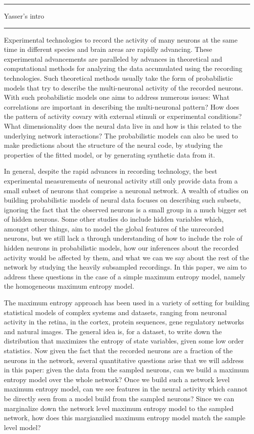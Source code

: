\documentclass[\ifafour a4paper,12pt,\else a5paper,10pt,\fi%
onecolumn,oneside,article,%
british%
]{memoir}
\theoremstyle{remark}
\theoremstyle{innote}
\renewcommand*{\|}{\nonscript\,\vert\nonscript\;\mathopen{}}
\begin{document}
\hrule
Yasser's intro
\hrule
{\footnotesize
Experimental technologies to record the activity of many neurons at the
same time in different species and brain areas are rapidly advancing. These
experimental advancements are paralleled by advances in theoretical and
computational methods for analyzing the data accumulated using the
recording technologies. Such theoretical methods usually take the form of
probabilistic models that try to describe the multi-neuronal activity of
the recorded neurons. With such probabilistic models one aims to address
numerous issues: What correlations are important in describing the
multi-neuronal pattern? How does the pattern of activity covary with
external stimuli or experimental conditions? What dimensionality does the
neural data live in and how is this related to the underlying network
interactions? The probabilistic models can also be used to make predictions
about the structure of the neural code, by studying the properties of the
fitted model, or by generating synthetic data from it.

In general, despite the rapid advances in recording technology, the best
experimental measurements of neuronal activity still only provide data from
a small subset of neurons that comprise a neuronal network. A wealth of
studies on building probabilistic models of neural data focuses on
describing such subsets, ignoring the fact that the observed neurons is a
small group in a much bigger set of hidden neurons. Some other studies do
include hidden variables which, amongst other things, aim to model the
global features of the unrecorded neurons, but we still lack a through
understanding of how to include the role of hidden neurons in probabilistic
models, how our inferences about the recorded activity would be affected by
them, and what we can we say about the rest of the network by studying the
heavily subsampled recordings. In this paper, we aim to address these
questions in the case of a simple maximum entropy model, namely the
homogeneous maximum entropy model.

The maximum entropy approach has been used in a variety of setting for
building statistical models of complex systems and datasets, ranging from
neuronal activity in the retina, in the cortex, protein sequences, gene
regulatory networks and natural images. The general idea is, for a dataset,
to write down the distribution that maximizes the entropy of state
variables, given some low order statistics. Now given the fact that the
recorded neurons are a fraction of the neurons in the network, several
quantitative questions arise that we will address in this paper: given the
data from the sampled neurons, can we build a maximum entropy model over
the whole network? Once we build such a network level maximum entropy
model, can we see features in the neural activity which cannot be directly
seen from a model build from the sampled neurons? Since we can marginalize
down the network level maximum entropy model to the sampled network, how
does this margianzlied maximum entropy model match the sample level model?

}
\end{document}
